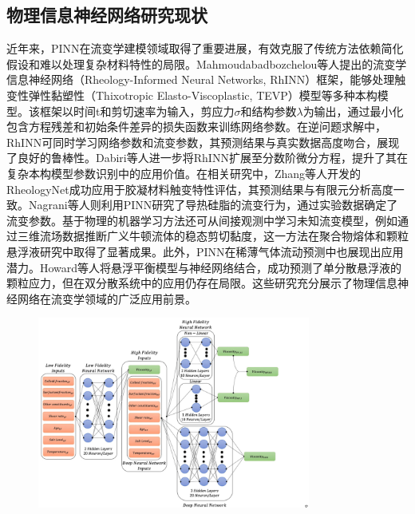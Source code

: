 \subsection{物理信息神经网络研究现状}
近年来，PINN在流变学建模领域取得了重要进展，有效克服了传统方法依赖简化假设和难以处理复杂材料特性的局限。Mahmoudabadbozchelou等人提出的流变学信息神经网络（Rheology-Informed Neural Networks​​, RhINN）框架，能够处理触变性弹性黏塑性（Thixotropic Elasto-Viscoplastic, TEVP）模型等多种本构模型\cite{mahmoudabadbozchelouRheologyInformedNeuralNetworks2021}。该框架以时间t和剪切速率为输入，剪应力$\sigma$和结构参数$\lambda$为输出，通过最小化包含方程残差和初始条件差异的损失函数来训练网络参数。在逆问题求解中，RhINN可同时学习网络参数和流变参数，其预测结果与真实数据高度吻合，展现了良好的鲁棒性。Dabiri等人进一步将RhINN扩展至分数阶微分方程，提升了其在复杂本构模型参数识别中的应用价值\cite{dabiri2023}。在相关研究中，Zhang等人开发的RheologyNet成功应用于胶凝材料触变特性评估，其预测结果与有限元分析高度一致\cite{zhangRheologyNetPhysicsinformedNeural2023}。Nagrani等人则利用PINN研究了导热硅脂的流变行为，通过实验数据确定了流变参数\cite{nagrani2023}。基于物理的机器学习方法还可从间接观测中学习未知流变模型，例如通过三维流场数据推断广义牛顿流体的稳态剪切黏度，这一方法在聚合物熔体和颗粒悬浮液研究中取得了显著成果。此外，PINN在稀薄气体流动预测中也展现出应用潜力\cite{tucnyLearningViscosityFunctions2024}。Howard等人将悬浮平衡模型与神经网络结合，成功预测了单分散悬浮液的颗粒应力，但在双分散系统中的应用仍存在局限。这些研究充分展示了物理信息神经网络在流变学领域的广泛应用前景\cite{howardMachineLearningMethods2023}。
\begin{figure}[htbp]
  \centering
  \includegraphics[width=0.8\textwidth]{Fig/MFNN.png}
\end{figure}

